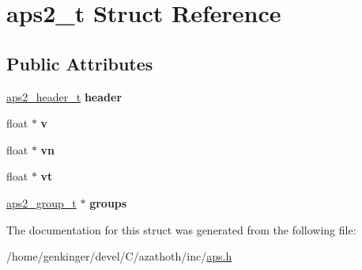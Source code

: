 \hypertarget{structaps2__t}{}\section{aps2\+\_\+t Struct Reference}
\label{structaps2__t}
\subsection*{Public Attributes}
\begin{DoxyCompactItemize}
\item 
\mbox{\label{structaps2__t_a2bef16f4c41a9c70c4ab4de940e4b3f1}} 
\mbox{\hyperlink{structaps2__header__t}{aps2\+\_\+header\+\_\+t}} {\bfseries header}
\item 
\mbox{\label{structaps2__t_a28db10ad1f87c8bd40802aaec986dcb6}} 
float $\ast$ {\bfseries v}
\item 
\mbox{\label{structaps2__t_af5e5b11f4ddd9dc0e5d7bdc4955c6268}} 
float $\ast$ {\bfseries vn}
\item 
\mbox{\label{structaps2__t_a2568adedb3aa22f9eaa57ba66ed9c519}} 
float $\ast$ {\bfseries vt}
\item 
\mbox{\label{structaps2__t_a1fcedefa176e699d6851fb7e7ca788bc}} 
\mbox{\hyperlink{structaps2__group__t}{aps2\+\_\+group\+\_\+t}} $\ast$ {\bfseries groups}
\end{DoxyCompactItemize}


The documentation for this struct was generated from the following file\+:\begin{DoxyCompactItemize}
\item 
/home/genkinger/devel/\+C/azathoth/inc/\mbox{\hyperlink{aps_8h}{aps.\+h}}\end{DoxyCompactItemize}
